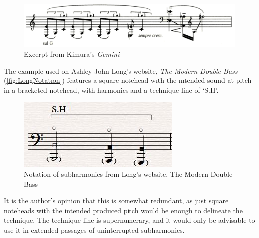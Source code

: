 
\begin{figure}
  \includegraphics[width=\linewidth]{./resources/kimura_gemini.png}
  \caption{Excerpt from Kimura's \emph{Gemini}}\label{fig:Excerpt from Kimura's Gemini}
\end{figure}

The example used on Ashley John Long's website, \emph{The Modern Double Bass} (\autoref{fig:LongNotation}) features a square notehead with the intended sound at pitch in a bracketed notehead, with harmonics and a technique line of `S.H'.\autocite[]{longSubharmonics2019}

\begin{figure}
  \includegraphics[width=\linewidth]{./resources/longSubharmonicNotation.jpg}
  \caption{Notation of subharmonics from Long's website, The Modern Double Bass}\label{fig:LongNotation}
\end{figure}

It is the author's opinion that this is somewhat redundant, as just square noteheads with the intended produced pitch would be enough to delineate the technique. 
The technique line is supernumerary, and it would only be advisable to use it in extended passages of uninterrupted subharmonics.


